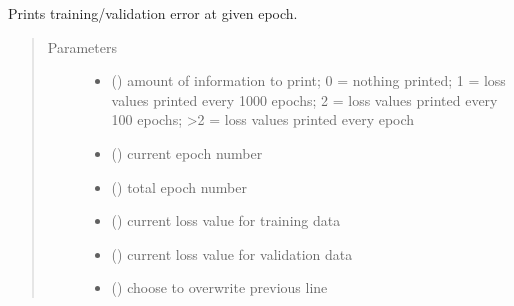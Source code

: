 \documentclass[letterpaper,10pt,english]{sphinxmanual}
\begin{document}

\begin{fulllineitems}
\label{\detokenize{rom:rom.utils.print_epoch}}
\sphinxAtStartPar
Prints training/validation error at given epoch.
\begin{quote}\begin{description}
\item[{Parameters}] \leavevmode\begin{itemize}
\item {} 
\sphinxAtStartPar
{} () \textendash{} amount of information to print; 0 = nothing printed; 1 = loss values printed every 1000 epochs; 2 = loss values printed every 100 epochs; \textgreater{}2 = loss values printed every epoch

\item {} 
\sphinxAtStartPar
{} () \textendash{} current epoch number

\item {} 
\sphinxAtStartPar
{} () \textendash{} total epoch number

\item {} 
\sphinxAtStartPar
{} () \textendash{} current loss value for training data

\item {} 
\sphinxAtStartPar
{} () \textendash{} current loss value for validation data

\item {} 
\sphinxAtStartPar
{} () \textendash{} choose to overwrite previous line

\end{itemize}

\end{description}\end{quote}

\end{fulllineitems}
\end{document}
